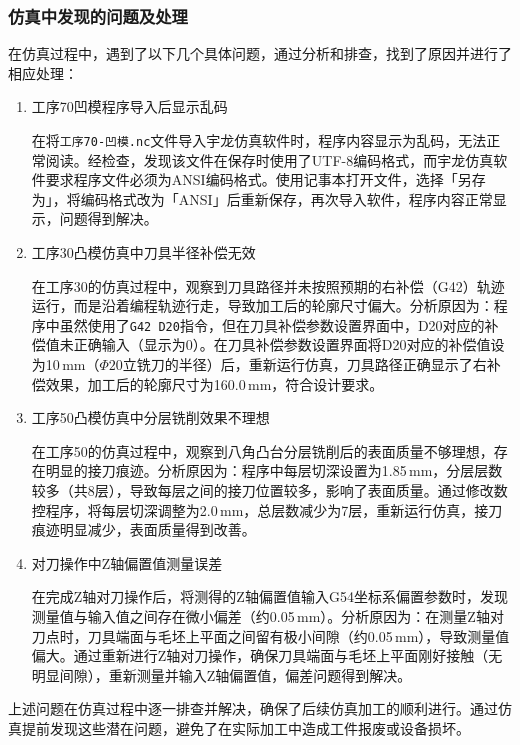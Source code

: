 \documentclass{xautCADreport}
\begin{document}
\subsubsection{仿真中发现的问题及处理}

在仿真过程中，遇到了以下几个具体问题，通过分析和排查，找到了原因并进行了相应处理：

\begin{enumerate}
  \item 工序70凹模程序导入后显示乱码
  
  在将\texttt{工序70-凹模.nc}文件导入宇龙仿真软件时，程序内容显示为乱码，无法正常阅读。经检查，发现该文件在保存时使用了UTF-8编码格式，而宇龙仿真软件要求程序文件必须为ANSI编码格式。使用记事本打开文件，选择「另存为」，将编码格式改为「ANSI」后重新保存，再次导入软件，程序内容正常显示，问题得到解决。
  
  \item 工序30凸模仿真中刀具半径补偿无效
  
  在工序30的仿真过程中，观察到刀具路径并未按照预期的右补偿（G42）轨迹运行，而是沿着编程轨迹行走，导致加工后的轮廓尺寸偏大。分析原因为：程序中虽然使用了\verb|G42 D20|指令，但在刀具补偿参数设置界面中，D20对应的补偿值未正确输入（显示为0）。在刀具补偿参数设置界面将D20对应的补偿值设为10\,mm（$\Phi20$立铣刀的半径）后，重新运行仿真，刀具路径正确显示了右补偿效果，加工后的轮廓尺寸为160.0\,mm，符合设计要求。
  
  \item 工序50凸模仿真中分层铣削效果不理想
  
  在工序50的仿真过程中，观察到八角凸台分层铣削后的表面质量不够理想，存在明显的接刀痕迹。分析原因为：程序中每层切深设置为1.85\,mm，分层层数较多（共8层），导致每层之间的接刀位置较多，影响了表面质量。通过修改数控程序，将每层切深调整为2.0\,mm，总层数减少为7层，重新运行仿真，接刀痕迹明显减少，表面质量得到改善。
  
  \item 对刀操作中Z轴偏置值测量误差
  
  在完成Z轴对刀操作后，将测得的Z轴偏置值输入G54坐标系偏置参数时，发现测量值与输入值之间存在微小偏差（约0.05\,mm）。分析原因为：在测量Z轴对刀点时，刀具端面与毛坯上平面之间留有极小间隙（约0.05\,mm），导致测量值偏大。通过重新进行Z轴对刀操作，确保刀具端面与毛坯上平面刚好接触（无明显间隙），重新测量并输入Z轴偏置值，偏差问题得到解决。
\end{enumerate}

上述问题在仿真过程中逐一排查并解决，确保了后续仿真加工的顺利进行。通过仿真提前发现这些潜在问题，避免了在实际加工中造成工件报废或设备损坏。
\end{document}
